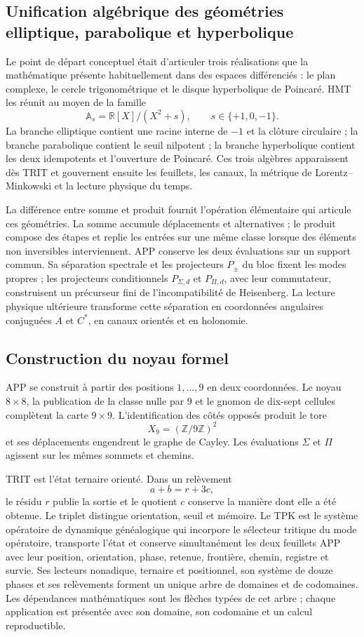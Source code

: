 \subsection*{Unification algébrique des géométries elliptique, parabolique et hyperbolique}

Le point de départ conceptuel était d'articuler trois réalisations que la
mathématique présente habituellement dans des espaces différenciés : le plan
complexe, le cercle trigonométrique et le disque hyperbolique de Poincaré. HMT
les réunit au moyen de la famille
\[
 \mathbb A_s=\mathbb R[X]/(X^2+s),
 \qquad s\in\{+1,0,-1\}.
\]
La branche elliptique contient une racine interne de \(-1\) et la clôture circulaire ; la
branche parabolique contient le seuil nilpotent ; la branche hyperbolique contient
les deux idempotents et l'ouverture de Poincaré. Ces trois algèbres apparaissent
dès TRIT et gouvernent ensuite les feuillets, les canaux, la métrique de
Lorentz--Minkowski et la lecture physique du temps.

La différence entre somme et produit fournit l'opération élémentaire qui
articule ces géométries. La somme accumule déplacements et alternatives ; le
produit compose des étapes et replie les entrées sur une même classe lorsque
des éléments non inversibles interviennent. APP conserve les deux évaluations sur
un support commun. Sa séparation spectrale et les projecteurs \(P_\pm\) du
bloc fixent les modes propres ; les projecteurs conditionnels
\(P_{\Sigma,d}\) et \(P_{\Pi,d}\), avec leur commutateur, construisent un précurseur
fini de l'incompatibilité de Heisenberg. La
lecture physique ultérieure transforme cette séparation en coordonnées
angulaires conjuguées \(A\) et \(C^*\),
en canaux orientés et en holonomie.

\subsection*{Construction du noyau formel}

APP se construit à partir des positions \(1,\ldots,9\) en deux coordonnées. Le
noyau \(8\times8\), la publication de
la classe nulle par \(9\) et le gnomon de dix-sept cellules complètent la
carte \(9\times9\). L'identification des côtés opposés produit le tore
\[
 X_9=(\mathbb Z/9\mathbb Z)^2
\]
et ses déplacements engendrent le graphe de Cayley. Les évaluations
\(\Sigma\) et \(\Pi\) agissent sur les mêmes sommets et chemins.

TRIT est l'état ternaire orienté. Dans un relèvement
\[
 a+b=r+3c,
\]
le résidu \(r\) publie la sortie et le quotient \(c\) conserve la manière dont elle a été
obtenue. Le triplet distingue orientation, seuil et mémoire. Le TPK est le
système opératoire de dynamique généalogique qui incorpore le sélecteur tritique
du mode opératoire, transporte l'état et conserve simultanément les deux
feuillets APP avec leur position, orientation, phase, retenue, frontière, chemin,
registre et survie. Ses lecteurs
nonadique, ternaire et positionnel, son système de douze phases et ses relèvements
forment un unique arbre de domaines et de codomaines. Les dépendances mathématiques
sont les flèches typées de cet arbre ; chaque application est présentée avec son domaine, son
codomaine et un calcul reproductible.


